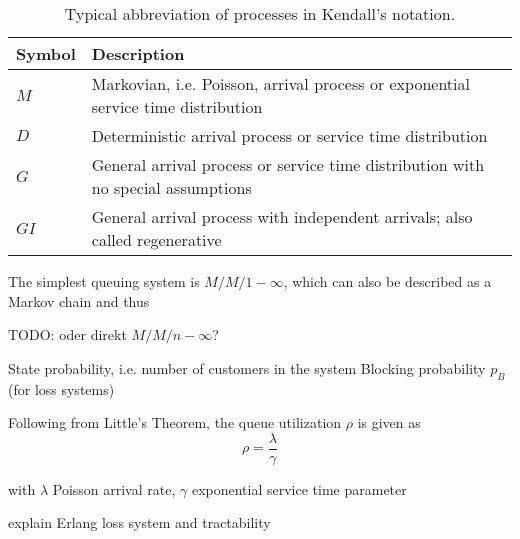 \begin{table}[htbp]
	\caption{Typical abbreviation of processes in Kendall's notation.}
	\label{c2:tbl:kendalldistributions}
	\begin{tabu}{X[l]X[6]}
	\toprule
	\textbf{Symbol} & \textbf{Description} \\
	\midrule
	$M$ & Markovian, i.e. Poisson, arrival process or exponential service time distribution\\
	$D$ & Deterministic arrival process or service time distribution\\
	$G$ & General arrival process or service time distribution with no special assumptions\\
	$GI$ & General arrival process with independent arrivals; also called regenerative \\ 
	\bottomrule
	\end{tabu} 
\end{table}

The simplest queuing system is \textit{$M/M/1-\infty$}, which can also be described as a Markov chain and thus 

TODO: oder direkt $M/M/n-\infty$?

State probability, i.e. number of customers in the system
Blocking probability $p_B$ (for loss systems)


Following from Little's Theorem, the queue utilization $\rho$ is given as
\begin{equation}
\rho = \frac{\lambda}{\gamma}
\end{equation}

with $\lambda$ Poisson arrival rate, $\gamma$ exponential service time parameter


explain Erlang loss system and tractability